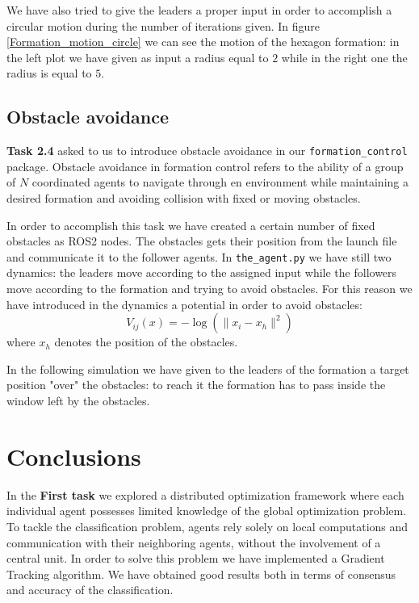 \documentclass[a4paper,11pt,oneside]{book}
\begin{document}
\bigskip
We have also tried to give the leaders a proper input in order to accomplish a circular motion during the number of iterations given. In figure \ref{Formation_motion_circle} we can see the motion of the hexagon formation: in the left plot we have given as input a radius equal to $2$ while in the right one the radius is equal to $5$.



\section{Obstacle avoidance}
\textbf{Task 2.4} asked to us to introduce obstacle avoidance in our \texttt{formation\_control} package. Obstacle avoidance in formation control refers to the ability of a group of $N$ coordinated agents to navigate through en environment while maintaining a desired formation and avoiding collision with fixed or moving obstacles. 

In order to accomplish this task we have created a certain number of fixed obstacles as ROS2 nodes. The obstacles gets their position from the launch file and communicate it to the follower agents. 
In \texttt{the\_agent.py} we have still two dynamics: the leaders move according to the assigned input while the followers move according to the formation and trying to avoid obstacles. For this reason we have introduced in the dynamics a potential in order to avoid obstacles:
\begin{equation}
V_{ij}(x) = - \log( \lVert x_i - x_h\rVert ^2)
\label{Obstacles_barrier}
\end{equation}
where $x_h$ denotes the position of the obstacles.

In the following simulation we have given to the leaders of the formation a target position "over" the obstacles: to reach it the formation has to pass inside the window left by the obstacles. 




\chapter*{Conclusions}
In the \textbf{First task} we explored a distributed optimization framework where each individual agent possesses limited knowledge of the global optimization problem. To tackle the classification problem, agents rely solely on local computations and communication with their neighboring agents, without the involvement of a central unit. In order to solve this problem we have implemented a Gradient Tracking algorithm. 
We have obtained good results both in terms of consensus and accuracy of the classification. 
\end{document}
